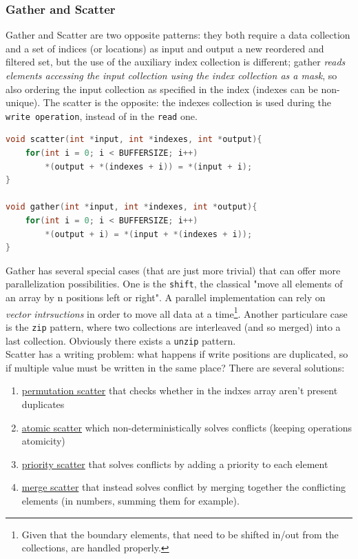 \documentclass{article}
\begin{document}
			\subsubsection{Gather and Scatter}
				Gather and Scatter are two opposite patterns: they both require a data collection and a set of indices (or locations) as input and output a new reordered and filtered set, but the use of the auxiliary index collection is different; gather \textit{reads elements accessing the input collection using the index collection as a mask}, so also ordering the input collection as specified in the index (indexes can be non-unique). The scatter is the opposite: the indexes collection is used during the \verb|write operation|, instead of in the \verb|read| one.
				\begin{lstlisting}[language = c]
void scatter(int *input, int *indexes, int *output){
	for(int i = 0; i < BUFFERSIZE; i++)
		*(output + *(indexes + i)) = *(input + i);
}

void gather(int *input, int *indexes, int *output){
	for(int i = 0; i < BUFFERSIZE; i++)
		*(output + i) = *(input + *(indexes + i));
}
				\end{lstlisting}
				Gather has several special cases (that are just more trivial) that can offer more parallelization possibilities. One is the \verb|shift|, the classical "move all elements of an array by n positions left or right". A parallel implementation can rely on \textit{vector intrsuctions} in order to move all data at a time\footnote{Given that the boundary elements, that need to be shifted in/out from the collections, are handled properly.}. Another particulare case is the \verb|zip| pattern, where two collections are interleaved (and so merged) into a last collection. Obviously there exists a \verb|unzip| pattern.\\
				Scatter has a writing problem: what happens if write positions are duplicated, so if multiple value must be written in the same place? There are several solutions:
				\begin{enumerate}
					\item \underline{permutation scatter} that checks whether in the indxes array aren't present duplicates
					\item \underline{atomic scatter} which non-deterministically solves conflicts (keeping operations atomicity)
					\item \underline{priority scatter} that solves conflicts by adding a priority to each element
					\item \underline{merge scatter} that instead solves conflict by merging together the conflicting elements (in numbers, summing them for example).
				\end{enumerate}
\end{document}
